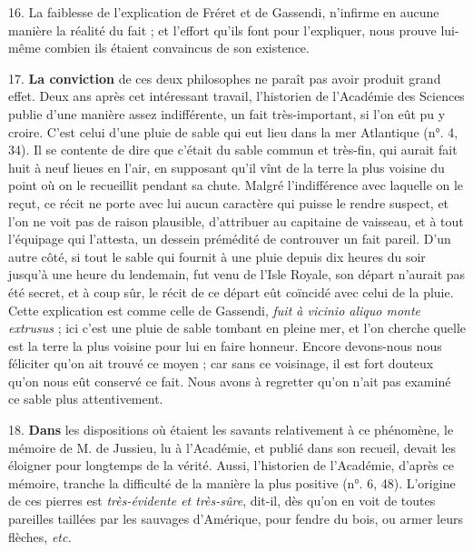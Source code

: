 \documentclass[a4paper, 11pt, oneside, polutonikogreek, french]{article}
\begin{document}
16. La faiblesse de l'explication de Fréret et de Gassendi, n'infirme en aucune manière la réalité du fait ; et l'effort qu'ils font pour l'expliquer, nous prouve lui-même combien ils étaient convaincus de son existence.

17. \textbf{La conviction} de ces deux philosophes ne paraît pas avoir produit grand effet. Deux ans après cet intéressant travail, l'historien de l'Académie des Sciences publie d'une manière assez indifférente, un fait très-important, si l'on eût pu y croire. C'est celui d'une pluie de sable qui eut lieu dans la mer Atlantique (n°. 4, 34). Il se contente de dire que c'était du sable commun et très-fin, qui aurait fait huit à neuf lieues en l'air, en supposant qu'il vînt de la terre la plus voisine du point où on le recueillit pendant sa chute. Malgré l'indifférence avec laquelle on le reçut, ce récit ne porte avec lui aucun caractère qui puisse le rendre suspect, et l'on ne voit pas de raison plausible, d'attribuer au capitaine de vaisseau, et à tout l'équipage qui l'attesta, un dessein prémédité de controuver un fait pareil. D'un autre côté, si tout le sable qui fournit à une pluie depuis dix heures du soir jusqu'à une heure du lendemain, fut venu de l’Isle Royale, son départ n'aurait pas été secret, et à coup sûr, le récit de ce départ eût coïncidé avec celui de la pluie. Cette explication est comme celle de Gassendi, \emph{fuit à vicinio aliquo monte extrusus} ; ici c'est une pluie de sable tombant en pleine mer, et l'on cherche quelle est la terre la plus voisine pour lui en faire honneur. Encore devons-nous nous féliciter qu'on ait trouvé ce moyen ; car sans ce voisinage, il est fort douteux qu'on nous eût conservé ce fait. Nous avons à regretter qu'on n'ait pas examiné ce sable plus attentivement.

18. \textbf{Dans} les dispositions où étaient les savants relativement à ce phénomène, le mémoire de M. de Jussieu, lu à l'Académie, et publié dans son recueil, devait les éloigner pour longtemps de la vérité. Aussi, l'historien de l'Académie, d'après ce mémoire, tranche la difficulté de la manière la plus positive (n°. 6, 48). \og L'origine de ces pierres est \emph{très-évidente et très-sûre}, dit-il, dès qu'on en voit de toutes pareilles taillées par les sauvages d'Amérique, pour fendre du bois, ou armer leurs flèches, \emph{etc.}
\end{document}
